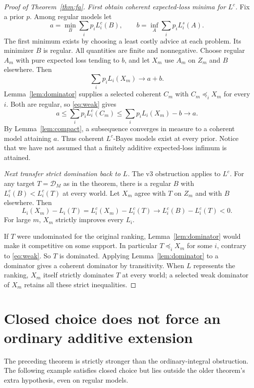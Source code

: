 \documentclass[11pt]{article}
\theoremstyle{remark}\newtheorem{remark}[theorem]{Remark}
\newcommand{\Dscr}{\mathcal D}
\begin{document}
\begin{proof}[Proof of Theorem~\ref{thm:fa}]
\emph{First obtain coherent expected-loss minima for $L^c$.}
Fix a prior $p$. Among regular models let
\[
 a=\min_B\sum_i p_i L_i^c(B),\qquad
 b=\inf_A\sum_i p_i L_i^s(A).
\]
The first minimum exists by choosing a least costly advice at each problem.
Its minimizer $B$ is regular. All quantities are finite and nonnegative.
Choose regular $A_m$ with pure expected loss tending to $b$, and let $X_m$
use $A_m$ on $Z_m$ and $B$ elsewhere. Then
\[
 \sum_i p_i L_i(X_m)\longrightarrow a+b.
\]
Lemma~\ref{lem:dominator} supplies a selected coherent $C_m$ with
$C_m\preceq_i X_m$ for every $i$. Both are regular, so \eqref{eq:weak} gives
\[
 a\le\sum_i p_iL_i^c(C_m)
 \le\sum_i p_iL_i(X_m)-b\longrightarrow a.
\]
By Lemma~\ref{lem:compact}, a subsequence converges in measure to a coherent
model attaining $a$. Thus coherent $L^c$-Bayes models exist at every prior.
Notice that we have not assumed that a finitely additive expected-loss
infimum is attained.

\emph{Next transfer strict domination back to $L$.}
The v3 obstruction applies to $L^c$. For any target $T=\Dscr_M$ as in the
theorem, there is a regular $B$ with $L_i^c(B)<L_i^c(T)$ at every world.
Let $X_m$ agree with $T$ on $Z_m$ and with $B$ elsewhere. Then
\[
 L_i(X_m)-L_i(T)=L_i^c(X_m)-L_i^c(T)
 \longrightarrow L_i^c(B)-L_i^c(T)<0.
\]
For large $m$, $X_m$ strictly improves every $L_i$.

If $T$ were undominated for the original ranking, Lemma~\ref{lem:dominator}
would make it competitive on some support. In particular
$T\preceq_i X_m$ for some $i$, contrary to \eqref{eq:weak}. So $T$ is
dominated. Applying Lemma~\ref{lem:dominator} to a dominator gives a coherent
dominator by transitivity. When $L$ represents the ranking, $X_m$ itself
strictly dominates $T$ at every world; a selected weak dominator of $X_m$
retains all these strict inequalities.
\end{proof}

\section{Closed choice does not force an ordinary additive extension}

The preceding theorem is strictly stronger than the ordinary-integral
obstruction. The following example satisfies closed choice but lies outside
the older theorem's extra hypothesis, even on regular models.
\end{document}
